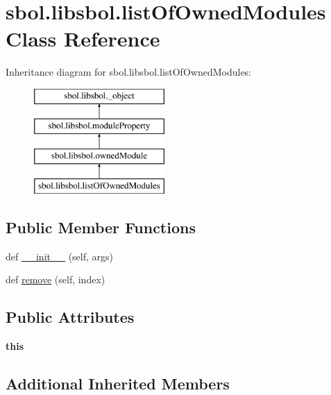 \hypertarget{classsbol_1_1libsbol_1_1list_of_owned_modules}{}\section{sbol.\+libsbol.\+list\+Of\+Owned\+Modules Class Reference}
\label{classsbol_1_1libsbol_1_1list_of_owned_modules}
Inheritance diagram for sbol.\+libsbol.\+list\+Of\+Owned\+Modules\+:\begin{figure}[H]
\begin{center}
\leavevmode
\includegraphics[height=4.000000cm]{classsbol_1_1libsbol_1_1list_of_owned_modules}
\end{center}
\end{figure}
\subsection*{Public Member Functions}
\begin{DoxyCompactItemize}
\item 
def \hyperlink{classsbol_1_1libsbol_1_1list_of_owned_modules_aa928bd17d4ecaac876d9374d1b70348a}{\+\_\+\+\_\+init\+\_\+\+\_\+} (self, args)
\item 
def \hyperlink{classsbol_1_1libsbol_1_1list_of_owned_modules_a7e5cd91ea4a288124ccf496cc933c650}{remove} (self, index)
\end{DoxyCompactItemize}
\subsection*{Public Attributes}
\begin{DoxyCompactItemize}
\item 
{\bfseries this}\hypertarget{classsbol_1_1libsbol_1_1list_of_owned_modules_a8941c5bc648934514e85ae79c6c8ef8b}{}\label{classsbol_1_1libsbol_1_1list_of_owned_modules_a8941c5bc648934514e85ae79c6c8ef8b}

\end{DoxyCompactItemize}
\subsection*{Additional Inherited Members}


